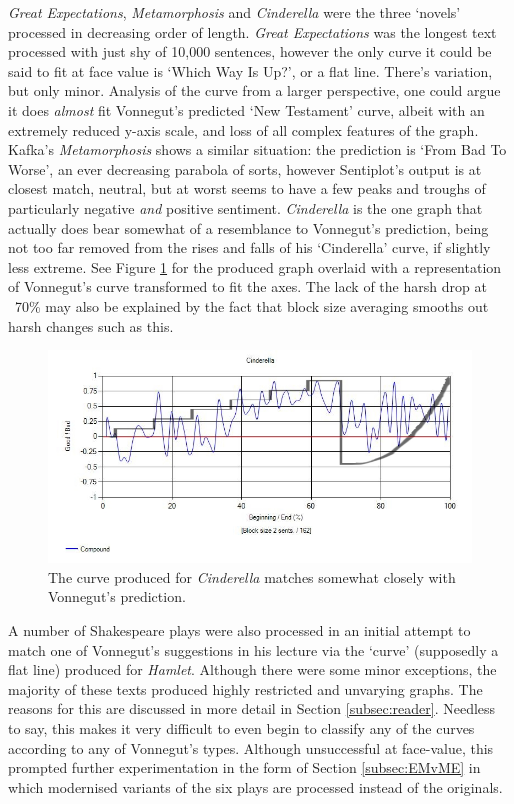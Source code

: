 \documentclass{article}
\begin{document}
{            \textit{Great Expectations}, \textit{Metamorphosis} and \textit{Cinderella} were the three `novels' processed in decreasing order of length. \textit{Great Expectations} was the longest text processed with just shy of 10,000 sentences, however the only curve it could be said to fit at face value is `Which Way Is Up?', or a flat line. There's variation, but only minor. Analysis of the curve from a larger perspective, one could argue it does \textit{almost} fit Vonnegut's predicted `New Testament' curve, albeit with an extremely reduced y-axis scale, and loss of all complex features of the graph. Kafka's \textit{Metamorphosis} shows a similar situation: the prediction is `From Bad To Worse', an ever decreasing parabola of sorts, however Sentiplot's output is at closest match, neutral, but at worst seems to have a few peaks and troughs of particularly negative \textit{and} positive sentiment. \textit{Cinderella} is the one graph that actually does bear somewhat of a resemblance to Vonnegut's prediction, being not too far removed from the rises and falls of his `Cinderella' curve, if slightly less extreme. See Figure \ref{fig:cinderellaComp} for the produced graph overlaid with a representation of Vonnegut's curve transformed to fit the axes. The lack of the harsh drop at ~70\% may also be explained by the fact that block size averaging smooths out harsh changes such as this.
            \begin{figure}[hbtp]
                \includegraphics[width=1\textwidth]{Figures/Curve/CinderellaComp}
                \centering
                \caption{The curve produced for \textit{Cinderella} matches somewhat closely with Vonnegut's prediction.} 
                \label{fig:cinderellaComp}
            \end{figure}
            A number of Shakespeare plays were also processed in an initial attempt to match one of Vonnegut's suggestions in his lecture via the `curve' (supposedly a flat line) produced for \textit{Hamlet}. Although there were some minor exceptions, the majority of these texts produced highly restricted and unvarying graphs. The reasons for this are discussed in more detail in Section \ref{subsec:reader}. Needless to say, this makes it very difficult to even begin to classify any of the curves according to any of Vonnegut’s types. Although unsuccessful at face-value, this prompted further experimentation in the form of Section \ref{subsec:EMvME} in which modernised variants of the six plays are processed instead of the originals.
}
\end{document}
